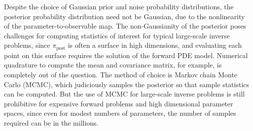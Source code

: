 \documentclass[11pt,final]{article}%
\renewcommand{\vec}[1] {\ensuremath{\boldsymbol{#1}}}
\begin{document}
Despite the choice
of Gaussian prior and noise probability distributions, the posterior
probability distribution need not be Gaussian, due to the nonlinearity
of the parameter-to-observable map.
The non-Gaussianity of the posterior poses challenges for computing
statistics of interest for typical large-scale inverse problems, since
$\pi_{\text{post}}$ is often a surface in high dimensions, and
evaluating each point on this surface requires the solution of the
forward PDE model.
Numerical quadrature to compute the mean and covariance
matrix, for example, is completely out of the question. The method of
choice 
is Markov chain Monte Carlo (MCMC), which judiciously samples the
posterior
so that sample statistics can be computed. But the use of MCMC for
large-scale inverse problems is still prohibitive for expensive
forward problems and high dimensional parameter spaces, since even for
modest numbers of parameters, the number of samples required can be in
the millions.
\end{document}
